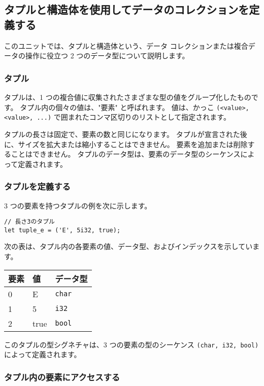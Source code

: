 \subsection{タプルと構造体を使用してデータのコレクションを定義する}

このユニットでは、タプルと構造体という、データ コレクションまたは複合データの操作に役立つ 2 つのデータ型について説明します。

\subsubsection{タプル}

タプルは、1 つの複合値に収集されたさまざまな型の値をグループ化したものです。 タプル内の個々の値は、"要素" と呼ばれます。 値は、かっこ \texttt{(<value>, <value>, ...)} で囲まれたコンマ区切りのリストとして指定されます。

タプルの長さは固定で、要素の数と同じになります。 タプルが宣言された後に、サイズを拡大または縮小することはできません。 要素を追加または削除することはできません。 タプルのデータ型は、要素のデータ型のシーケンスによって定義されます。

\subsubsection{タプルを定義する}

3 つの要素を持つタプルの例を次に示します。


\begin{lstlisting}[numbers=none]
// 長さ3のタプル
let tuple_e = ('E', 5i32, true);
\end{lstlisting}

次の表は、タプル内の各要素の値、データ型、およびインデックスを示しています。

\begin{tabular}{lll}
要素 & 値 & データ型\\ \hline
0 & E & \texttt{char}\\ \hline
1 & 5 & \texttt{i32}\\ \hline
2 & true & \texttt{bool}\\
\end{tabular}

このタプルの型シグネチャは、3 つの要素の型のシーケンス \texttt{(char, i32, bool)} によって定義されます。

\subsubsection{タプル内の要素にアクセスする}

